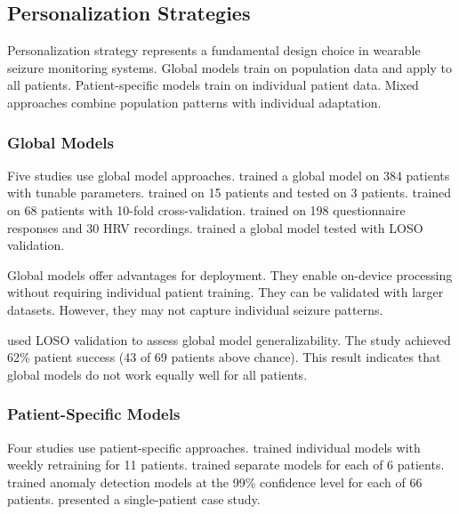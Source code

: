 \subsection{Personalization Strategies}

Personalization strategy represents a fundamental design choice in wearable seizure monitoring systems. Global models train on population data and apply to all patients. Patient-specific models train on individual patient data. Mixed approaches combine population patterns with individual adaptation.

\subsubsection{Global Models}

Five studies use global model approaches. \textcite{spahrDeepLearningbasedDetection2025} trained a global model on 384 patients with tunable parameters. \textcite{fineDetectionKeyAutomated2025} trained on 15 patients and tested on 3 patients. \textcite{dongTwoLayerEnsembleMethod2022} trained on 68 patients with 10-fold cross-validation. \textcite{elemamAutomatedValidatedTool2025} trained on 198 questionnaire responses and 30 HRV recordings. \textcite{meiselMachineLearningWristband2020} trained a global model tested with LOSO validation.

Global models offer advantages for deployment. They enable on-device processing without requiring individual patient training. They can be validated with larger datasets. However, they may not capture individual seizure patterns.

\textcite{meiselMachineLearningWristband2020} used LOSO validation to assess global model generalizability. The study achieved 62\% patient success (43 of 69 patients above chance). This result indicates that global models do not work equally well for all patients.

\subsubsection{Patient-Specific Models}

Four studies use patient-specific approaches. \textcite{stirlingForecastingSeizureLikelihood2021} trained individual models with weekly retraining for 11 patients. \textcite{nasseriAmbulatorySeizureForecasting2021} trained separate models for each of 6 patients. \textcite{odeDevelopmentEpilepticSeizure2023} trained anomaly detection models at the 99\% confidence level for each of 66 patients. \textcite{singhrathoreDevelopmentMultimodalMachine2024} presented a single-patient case study.

